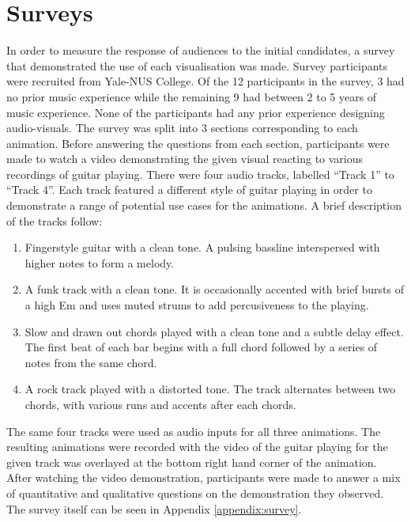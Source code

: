 \documentclass[../initial_thesis.tex]{subfiles}
\begin{document}
\section{Surveys}

In order to measure the response of audiences to the initial candidates, a survey that demonstrated the use of each visualisation was made. Survey participants were recruited from Yale-NUS College. Of the 12 participants in the survey, 3 had no prior music experience while the remaining 9 had between 2 to 5 years of music experience. None of the participants had any prior experience designing audio-visuals. The survey was split into 3 sections corresponding to each animation. Before answering the questions from each section, participants were made to watch a video demonstrating the given visual reacting to various recordings of guitar playing. There were four audio tracks, labelled ``Track 1'' to ``Track 4''. Each track featured a different style of guitar playing in order to demonstrate a range of potential use cases for the animations. A brief description of the tracks follow:

\begin{enumerate}
\item {Fingerstyle guitar with a clean tone. A pulsing bassline interspersed with higher notes to form a melody.} %
\item {A funk track with a clean tone. It is occasionally accented with brief bursts of a high Em and uses muted strums to add percusiveness to the playing.}
\item {Slow and drawn out chords played with a clean tone and a subtle delay effect. The first beat of each bar begins with a full chord followed by a series of notes from the same chord.}
\item {A rock track played with a distorted tone. The track alternates between two chords, with various runs and accents after each chords.}
\end{enumerate}

The same four tracks were used as audio inputs for all three animations. The resulting animations were recorded with the video of the guitar playing for the given track was overlayed at the bottom right hand corner of the animation. After watching the video demonstration, participants were made to answer a mix of quantitative and qualitative questions on the demonstration they observed. The survey itself can be seen in Appendix \ref{appendix:survey}. \par
\end{document}

